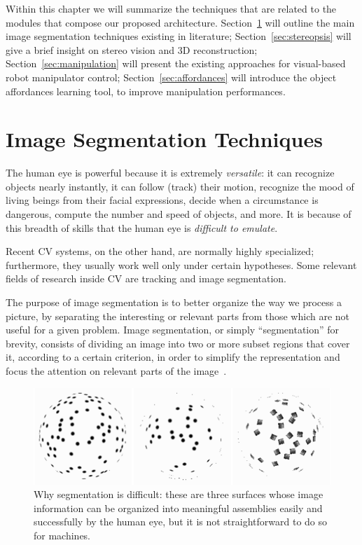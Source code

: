 \bigskip

Within this chapter we will summarize the techniques that are related to the modules that compose our proposed architecture. Section~\ref{sec:segmentation} will outline the main image segmentation techniques existing in literature; Section~\ref{sec:stereopsis} will give a brief insight on stereo vision and 3D reconstruction; Section~\ref{sec:manipulation} will present the existing approaches for visual-based robot manipulator control; Section~\ref{sec:affordances} will introduce the object affordances learning tool, to improve manipulation performances.

\section{Image Segmentation Techniques}
\label{sec:segmentation} 

The human eye is powerful because it is extremely \emph{versatile}: it can recognize objects nearly instantly, it can follow (track) their motion, recognize the mood of living beings from their facial expressions, decide when a circumstance is dangerous, compute the number and speed of objects, and more. It is because of this breadth of skills that the human eye is \emph{difficult to emulate}.

Recent \ac{CV} systems, on the other hand, are normally highly specialized; furthermore, they usually work well only under certain hypotheses. Some relevant fields of research inside \ac{CV} are tracking and image segmentation.

The purpose of image segmentation is to better organize the way we process a picture, by separating the interesting or relevant parts from those which are not useful for a given problem. Image segmentation, or simply ``segmentation'' for brevity, consists of dividing an image into two or more subset regions that cover it, according to a certain criterion, in order to simplify the representation and focus the attention on relevant parts of the image~\cite{foley}.

\begin{figure}
\centering
\includegraphics[scale=0.5]{figures/segm_3blobs}
\caption[Why segmentation is difficult]{Why segmentation is difficult: these are three surfaces whose image information can be organized into meaningful assemblies easily and successfully by the human eye, but it is not straightforward to do so for machines.}
\label{img:segment_3blobs}
\end{figure}

